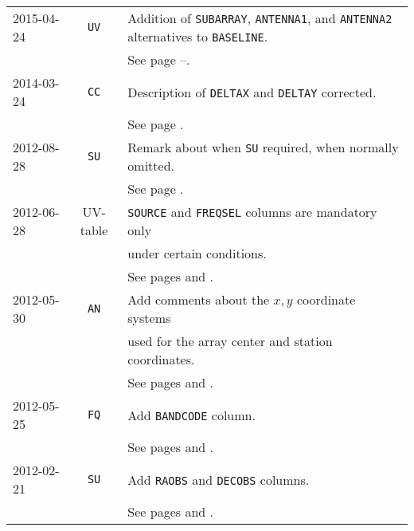 \documentclass[twoside]{article}
\newcommand{\Hi}[1]{\textcolor{hicol}{#1}}
\newcommand{\Me}[1]{\textcolor{mecol}{#1}}
\newcommand{\hblack}{\color{black}}
\begin{document}
\begin{center}
\begin{tabular}{lcl}
\Hi{2015-04-24} & \Hi{{\tt UV}} & \Hi{Addition of {\tt SUBARRAY},
                  {\tt ANTENNA1}, and {\tt ANTENNA2} alternatives
                  to {\tt BASELINE}.} \\
    &          & \Hi{See page \pageref{RGranpar}--\pageref{TAranpar}.} \\
\noalign{\vspace{4pt}}
\Hi{2014-03-24} & \Hi{{\tt CC}} & \Hi{Description of {\tt DELTAX} and
                        {\tt DELTAY} corrected.} \\
           &          & \Hi{See page \pageref{s:CC}.} \\
\noalign{\vspace{4pt}}
\Me{2012-08-28} & \Me{{\tt SU}} & \Me{Remark about when {\tt SU}
                       required, when normally omitted.} \\
           &          & \Me{See page \pageref{s:SU}.} \\
\noalign{\vspace{4pt}}
\Me{2012-06-28} & \Me{UV-table} & \Me{{\tt SOURCE} and {\tt FREQSEL}
                        columns are mandatory only} \\
           &          & \Me{under certain conditions.} \\
           &          & \Me{See pages \pageref{rev:UVt1} and
                        \pageref{rev:UVt2}.} \\
\noalign{\vspace{4pt}}
\Me{2012-05-30} & \Me{{\tt AN}} & \Me{Add comments about the $x,y$
                       coordinate systems} \\
           &          & \Me{used for the array center and station
                       coordinates.} \\
           &          & \Me{See pages \pageref{rev:AN1} and
                       \pageref{rev:AN2}.} \\
\noalign{\vspace{4pt}}
\Me{2012-05-25} & \Me{{\tt FQ}} & \Me{Add {\tt BANDCODE} column.} \\
           &          & \Me{See pages \pageref{ta:FQcols} and
                       \pageref{rev:FQ}.} \\
\noalign{\vspace{4pt}}
\Me{2012-02-21} & \Me{{\tt SU}} & \Me{Add {\tt RAOBS} and {\tt DECOBS}
                        columns.} \\
           &          & \Me{See pages \pageref{ta:SUcols} and
                       \pageref{rev:SU}.} \\
\end{tabular}
\end{center}
\hblack
\end{document}
